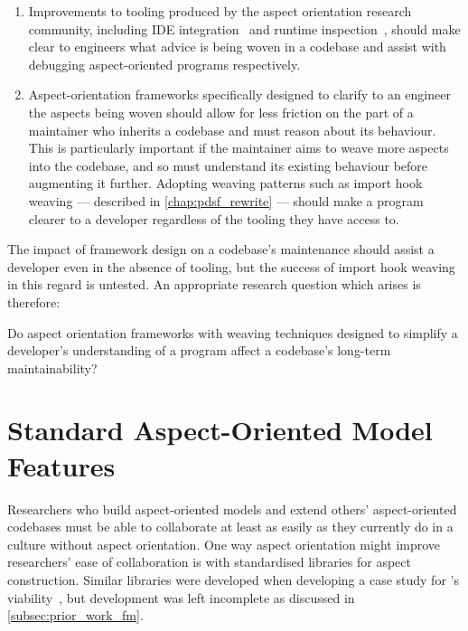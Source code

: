 \begin{enumerate}
    \item Improvements to tooling produced by the aspect orientation research
    community, including IDE integration~\cite{clement2003eclipseAJDT} and
    runtime inspection~\cite{mehner2002towards}, should make clear to engineers
    what advice is being woven in a codebase and assist with debugging
    aspect-oriented programs respectively.
    \item Aspect-orientation frameworks specifically designed to clarify to an
    engineer the aspects being woven should allow for less friction on the part
    of a maintainer who inherits a codebase and must reason about its behaviour.
    This is particularly important if the maintainer aims to weave more aspects
    into the codebase, and so must understand its existing behaviour before
    augmenting it further. Adopting weaving patterns such as import hook weaving
    --- described in \cref{chap:pdsf_rewrite} --- should make a program clearer
    to a developer regardless of the tooling they have access to.
\end{enumerate}

The impact of framework design on a codebase's maintenance should assist a
developer even in the absence of tooling, but the success of import hook weaving
in this regard is untested. An appropriate research question which arises is
therefore:

\begin{researchquestion}
Do aspect orientation frameworks with weaving techniques designed to simplify a
developer's understanding of a program affect a codebase's long-term
maintainability?
\end{researchquestion}


\section{Standard Aspect-Oriented Model
Features}
\label{standard_aosm_model_features}

Researchers who build aspect-oriented models and extend others' aspect-oriented
codebases must be able to collaborate at least as easily as they currently do in
a culture without aspect orientation. One way aspect orientation might improve
researchers' ease of collaboration is with standardised libraries for aspect
construction. Similar libraries were developed when developing a case study for
\pdsf{}'s viability~\cite{wallis2018caise,fuzzimoss_repo}, but development was
left incomplete as discussed in \cref{subsec:prior_work_fm}.

